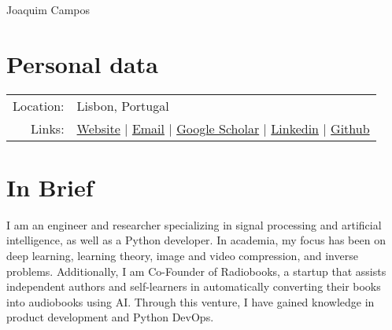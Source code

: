 \documentclass[a4paper,11pt]{article}
\newcommand{\optExtraSpace}{}
\newcommand{\optExtraSpace}{\vspace{5pt}}
\begin{document}
  \pagestyle{empty}


  \par{\Huge Joaquim Campos}\bigskip\par

  \vspace{15pt}
  \optExtraSpace

  \section{Personal data}

    \begin{tabular}{rl}
      Location: & Lisbon, Portugal \\
      Links: & \href{https://joaquimcampos.com}{Website} | \href{mailto:joaquimcampos@duck.com}{Email} | \href{https://scholar.google.com/citations?user=GT-VCroAAAAJ}{Google Scholar} |  \href{https://www.linkedin.com/in/joaquim-campos}{Linkedin} | \href{https://github.com/joaquimcampos/}{Github} \\
    \end{tabular}


  \vspace{15pt}
  \optExtraSpace

  \section{In Brief}
    I am an engineer and researcher specializing in signal processing and artificial intelligence, as well as a Python developer. In academia, my focus has been on deep learning, learning theory, image and video compression, and inverse problems. Additionally, I am Co-Founder of Radiobooks, a startup that assists independent authors and self-learners in automatically converting their books into audiobooks using AI. Through this venture, I have gained knowledge in product development and Python DevOps.
\end{document}
